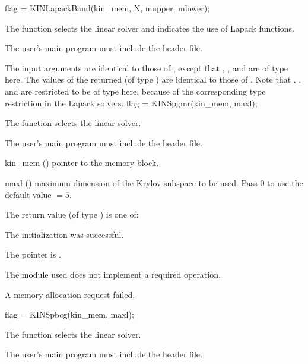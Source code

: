 {
  flag = KINLapackBand(kin\_mem, N, mupper, mlower);
}
{
  The function  selects the {\kinband} linear solver and
  indicates the use of Lapack functions. 

  The user's main program must include the  header file.
}
{
  The input arguments are identical to those of , except
  that , , and  are of type  here.
}
{
  The values of the returned  (of type ) are identical
  to those of .
}
{
  Note that , , and  are restricted to be of type 
  here, because of the corresponding type restriction in the Lapack solvers.
}
{
  flag = KINSpgmr(kin\_mem, maxl);
}
{
  The function  selects the {\kinspgmr} linear solver.

  The user's main program must include the  header file.
}
{
  \begin{args}
  \item[kin\_mem] ()
    pointer to the {\kinsol} memory block.
  \item[maxl] ()
    maximum dimension of the Krylov subspace to be used. Pass $0$ to use the 
    default value $=5$.
  \end{args}
}
{
  The return value  (of type ) is one of:
  \begin{args}
  \item[\Id{KINSPILS\_SUCCESS}] 
    The {\kinspgmr} initialization was successful.
  \item[\Id{KINSPILS\_MEM\_NULL}]
    The  pointer is .
  \item[\Id{KINSPILS\_ILL\_INPUT}]
    The {\nvector} module used does not implement a required operation.
  \item[\Id{KINSPILS\_MEM\_FAIL}]
    A memory allocation request failed.
  \end{args}
}
{}
{
  flag = KINSpbcg(kin\_mem, maxl);
}
{
  The function  selects the {\kinspbcg} linear solver.

  The user's main program must include the  header file.
}
